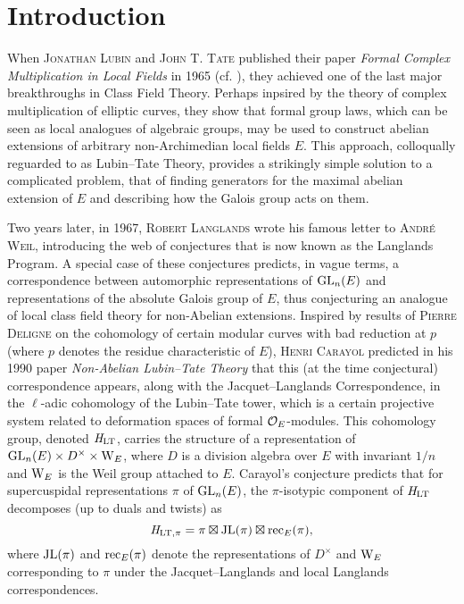 \documentclass[../main.tex]{subfiles}
\begin{document}
\section*{Introduction} %

When \textsc{Jonathan Lubin} and \textsc{John T. Tate} published their
paper \textit{Formal Complex Multiplication in Local Fields} in 1965 (cf.
\cite{LubinTateFormalMult}), they achieved one of the last major breakthroughs
in Class Field Theory. Perhaps inpsired by the theory of complex multiplication
of elliptic curves, they show that formal group laws, which can be seen as local
analogues of algebraic groups, may be used to construct abelian extensions of
arbitrary non-Archimedian local fields $E$. This approach, colloqually
reguarded to as Lubin--Tate Theory, provides a strikingly simple solution to a
complicated problem, that of finding generators for the maximal abelian
extension of $E$ and describing how the Galois group acts on them. 

Two years later, in 1967, \textsc{Robert Langlands} wrote his famous letter 
to \textsc{André Weil}, introducing the web of conjectures that 
is now known as the Langlands Program. A special case of these conjectures 
predicts, in vague terms, a correspondence between automorphic representations
of $\operatorname{GL}_n(E)$ and representations of the absolute Galois group of $E$, thus
conjecturing an analogue of local class field theory for non-Abelian extensions. 
Inspired by results of \textsc{Pierre Deligne} on the cohomology of certain
modular curves with bad reduction at $p$ (where $p$ denotes the residue
characteristic of $E$), \textsc{Henri Carayol} predicted in his 1990 paper
\textit{Non-Abelian Lubin--Tate Theory} that this (at the time conjectural)
correspondence appears, along with the Jacquet--Langlands Correspondence, in
the $\ell$-adic cohomology of the Lubin--Tate tower, which is a certain projective
system related to deformation spaces of formal $\mathcal{O}_E$-modules.
This cohomology group, denoted $\mathit H_{\mathrm{LT}}$, carries the structure of a
representation of $\operatorname{GL}_n(E) \times D^\times \times \mathrm W_E$, where $D$ is a
division algebra over $E$ with invariant $1/n$ and $\mathrm W_E$ is the Weil group
attached to $E$. Carayol's conjecture predicts that for supercuspidal
representations $\pi$ of $\operatorname{GL}_n(E)$, the $\pi$-isotypic component of $\mathit H_{\mathrm{LT}}$
decomposes (up to duals and twists) as
\begin{equation*}
  \mathit H_{\mathrm{LT},\pi} = \pi \boxtimes \mathrm{JL}(\pi) \boxtimes \mathrm{rec}_E(\pi),
\end{equation*}
where $\mathrm{JL}(\pi)$ and $\mathrm{rec}_E(\pi)$ denote the representations 
of $D^\times$ and $\mathrm W_E$ corresponding to $\pi$ under the Jacquet--Langlands and 
local Langlands correspondences.
\end{document}

